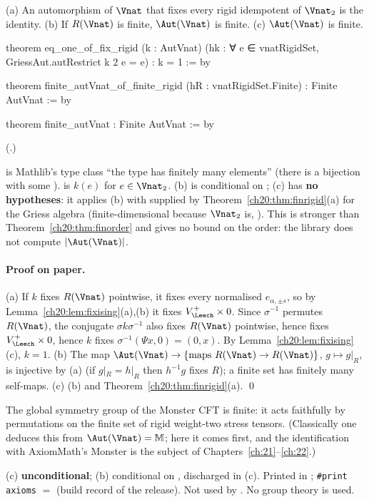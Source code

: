 \begin{theorem}\label{ch20:thm:finite}
(a) An automorphism of $\Vnat$ that fixes every rigid idempotent of $\Vnat_2$ is the identity.  (b) If $R(\Vnat)$ is finite,
$\Aut(\Vnat)$ is finite.  (c) $\Aut(\Vnat)$ is finite.
\end{theorem}
\begin{leancode}
theorem eq_one_of_fix_rigid (k : AutVnat)
    (hk : ∀ e ∈ vnatRigidSet, GriessAut.autRestrict k 2 e = e) : k = 1 := by

theorem finite_autVnat_of_finite_rigid (hR : vnatRigidSet.Finite) : Finite AutVnat := by

theorem finite_autVnat : Finite AutVnat := by
\end{leancode}
(.)
\begin{dictionary}
 is Mathlib's type class ``the type  has finitely many elements'' (there is a bijection
with some ).   is $k(e)$ for $e\in\Vnat_2$.  (b) is conditional on ;
(c) has \textbf{no hypotheses}: it applies (b) with  supplied by Theorem~\ref{ch20:thm:finrigid}(a) for the Griess
algebra (finite-dimensional because $\Vnat_2$ is, ).  This is stronger than
Theorem~\ref{ch20:thm:finorder} and gives no bound on the order: the library does not compute $|\Aut(\Vnat)|$.
\end{dictionary}
\paragraph{Proof on paper.}  (a) If $k$ fixes $R(\Vnat)$ pointwise, it fixes every normalised $e_{\alpha,\pm s}$, so by
Lemma~\ref{ch20:lem:fixising}(a),(b) it fixes $\chtwentyVL\times0$.  Since $\sigma^{-1}$ permutes $R(\Vnat)$, the conjugate
$\sigma k\sigma^{-1}$ also fixes $R(\Vnat)$ pointwise, hence fixes $\chtwentyVL\times0$, hence $k$ fixes $\sigma^{-1}(\Psi x,0)=(0,x)$.
By Lemma~\ref{ch20:lem:fixising}(c), $k=1$.  (b) The map $\Aut(\Vnat)\to\{\text{maps }R(\Vnat)\to R(\Vnat)\}$, $g\mapsto g|_{R}$, is
injective by (a) (if $g|_R=h|_R$ then $h^{-1}g$ fixes $R$); a finite set has finitely many self-maps.  (c) (b) and
Theorem~\ref{ch20:thm:finrigid}(a). \qed
\begin{physics}
The global symmetry group of the Monster CFT is finite: it acts faithfully by permutations on the finite set of rigid
weight-two stress tensors.  (Classically one deduces this from $\Aut(\Vnat)=\mathbb M$; here it comes first, and the
identification with AxiomMath's Monster is the subject of Chapters~\ref{ch:21}--\ref{ch:22}.)
\end{physics}
\begin{status}
(c) \textbf{unconditional}; (b) conditional on , discharged in (c).  Printed in
; \texttt{\#print axioms} $=$ 
(build record of the release).  Not used by .  No group
theory is used.
\end{status}

